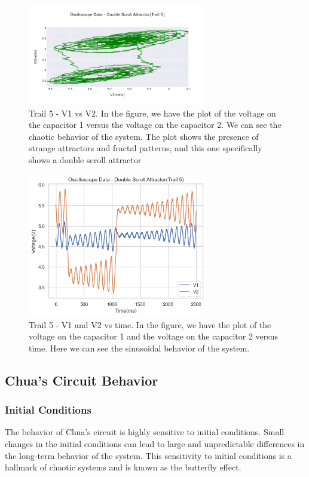 \documentclass[12pt]{article}
\begin{document}
        \begin{figure}[h!]
                \centering
                \includegraphics[width=0.7\textwidth]{./img/plots/Trail5_VonV.png}
                \caption{Trail 5 - V1 vs V2. In the figure, we have the plot of the voltage on the capacitor 1 versus the voltage on the capacitor 2. 
                We can see the chaotic behavior of the system. The plot shows the presence of strange attractors and fractal patterns, and this one specifically shows a double scroll attractor}
                \label{fig: Trail 5 - V on V.}
        \end{figure} \pagebreak
        \begin{figure}[h!]
                \centering
                \includegraphics[width=0.7\textwidth]{./img/plots/Trail5_O.png}
                \caption{Trail 5 - V1 and V2 vs time. In the figure, we have the plot of the voltage on the capacitor 1 and the voltage on the capacitor 2 versus time. 
                Here we can see the sinusoidal behavior of the system. }
        \end{figure}
        \subsection{Chua's Circuit Behavior}
                \subsubsection{Initial Conditions}
                The behavior of Chua's circuit is highly sensitive to initial conditions. Small changes in the initial conditions
                can lead to large and unpredictable differences in the long-term behavior of the system. This sensitivity to initial
                conditions is a hallmark of chaotic systems and is known as the butterfly effect.
\end{document}
